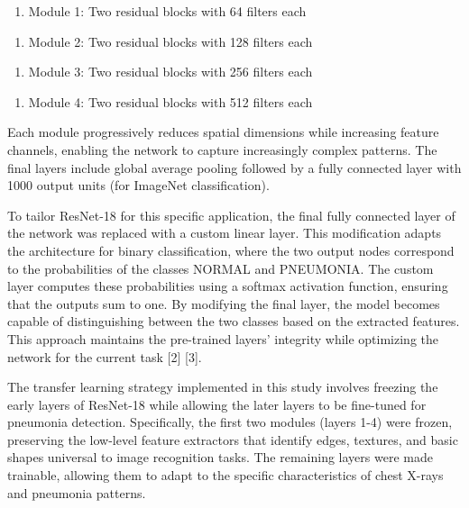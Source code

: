 \documentclass[
  twocolumn,
  10pt,
  a4paper,
  journal
]{IEEEtran}
\begin{document}
\begin{enumerate}
\def\labelenumi{\arabic{enumi}.}
\item
  Module 1: Two residual blocks with 64 filters each
\end{enumerate}

\begin{enumerate}
\def\labelenumi{\arabic{enumi}.}
\setcounter{enumi}{1}
\item
  Module 2: Two residual blocks with 128 filters each
\end{enumerate}

\begin{enumerate}
\def\labelenumi{\arabic{enumi}.}
\setcounter{enumi}{2}
\item
  Module 3: Two residual blocks with 256 filters each
\end{enumerate}

\begin{enumerate}
\def\labelenumi{\arabic{enumi}.}
\setcounter{enumi}{3}
\item
  Module 4: Two residual blocks with 512 filters each
\end{enumerate}

Each module progressively reduces spatial dimensions while increasing feature channels, enabling the network to capture increasingly complex patterns. The final layers include global average pooling followed by a fully connected layer with 1000 output units (for ImageNet classification).

To tailor ResNet-18 for this specific application, the final fully connected layer of the network was replaced with a custom linear layer. This modification adapts the architecture for binary classification, where the two output nodes correspond to the probabilities of the classes NORMAL and PNEUMONIA. The custom layer computes these probabilities using a softmax activation function, ensuring that the outputs sum to one. By modifying the final layer, the model becomes capable of distinguishing between the two classes based on the extracted features. This approach maintains the pre-trained layers' integrity while optimizing the network for the current task {[}2{]} {[}3{]}.

The transfer learning strategy implemented in this study involves freezing the early layers of ResNet-18 while allowing the later layers to be fine-tuned for pneumonia detection. Specifically, the first two modules (layers 1-4) were frozen, preserving the low-level feature extractors that identify edges, textures, and basic shapes universal to image recognition tasks. The remaining layers were made trainable, allowing them to adapt to the specific characteristics of chest X-rays and pneumonia patterns.
\end{document}
